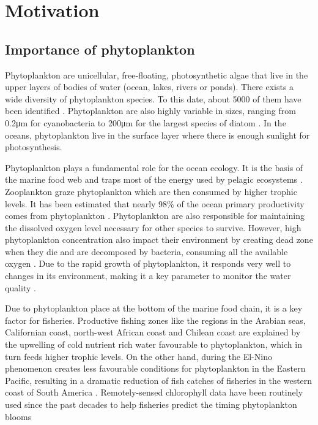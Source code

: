 

\chapter{Motivation}

\section{Importance of phytoplankton}

Phytoplankton are unicellular, free-floating, photosynthetic algae that live in the upper layers of bodies of water (ocean, lakes, rivers or ponds). There exists a wide diversity of phytoplankton species. To this date, about 5000 of them have been identified \cite{Tett1995}. Phytoplankton are also highly variable in sizes, ranging from 0.2μm for cyanobacteria to 200μm for the largest species of diatom \cite{Pal2014}. In the oceans, phytoplankton live in the surface layer where there is enough sunlight for photosynthesis. 

Phytoplankton plays a fundamental role for the ocean ecology. It is the basis of the marine food web and traps most of the energy used by pelagic ecosystems \cite{Pal2014}. Zooplankton graze phytoplankton which are then consumed by higher trophic levels. It has been estimated that nearly 98\% of the ocean primary productivity comes from phytoplankton \cite{Pal2014}. Phytoplankton are also responsible for maintaining the dissolved oxygen level necessary for other species to survive. However, high phytoplankton concentration also impact their environment by creating dead zone when they die and are decomposed by bacteria, consuming all the available oxygen \cite{Pal2014}. Due to the rapid growth of phytoplankton, it responds very well to changes in its environment, making it a key parameter to monitor the water quality \cite{Wu2014}.

Due to phytoplankton place at the bottom of the marine food chain, it is a key factor for fisheries. Productive fishing zones like the regions in the Arabian seas, Californian coast, north-west African coast and Chilean coast are explained by the upwelling of cold nutrient rich water favourable to phytoplankton, which in turn feeds higher trophic levels. On the other hand, during the El-Nino phenomenon creates less favourable conditions for phytoplankton in the Eastern Pacific, resulting in a dramatic reduction of fish catches of fisheries in the western coast of South America \cite{Robinson2010}. Remotely-sensed chlorophyll data have been routinely used since the past decades to help fisheries predict the timing phytoplankton blooms \cite{Robinson2010}

